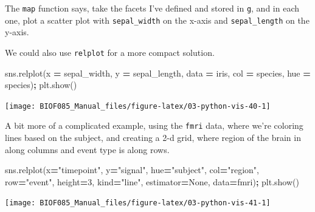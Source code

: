 \documentclass[
  letterpaper,
]{scrbook}
\newenvironment{Shaded}{\begin{snugshade}}{\end{snugshade}}
\newcommand{\DecValTok}[1]{\textcolor[rgb]{0.00,0.00,0.81}{#1}}
\newcommand{\NormalTok}[1]{#1}
\newcommand{\OperatorTok}[1]{\textcolor[rgb]{0.81,0.36,0.00}{\textbf{#1}}}
\newcommand{\StringTok}[1]{\textcolor[rgb]{0.31,0.60,0.02}{#1}}
\newcommand{\VariableTok}[1]{\textcolor[rgb]{0.00,0.00,0.00}{#1}}
\begin{document}
The \texttt{map} function says, take the facets I've defined and stored in \texttt{g}, and in each one, plot a scatter plot with \texttt{sepal\_width} on the x-axis and \texttt{sepal\_length} on the y-axis.

We could also use \texttt{relplot} for a more compact solution.

\begin{Shaded}
\begin{Highlighting}[]
\NormalTok{sns.relplot(x }\OperatorTok{=} \StringTok{\textquotesingle{}sepal\_width\textquotesingle{}}\NormalTok{, y }\OperatorTok{=} \StringTok{\textquotesingle{}sepal\_length\textquotesingle{}}\NormalTok{, data }\OperatorTok{=}\NormalTok{ iris, }
\NormalTok{            col }\OperatorTok{=} \StringTok{\textquotesingle{}species\textquotesingle{}}\NormalTok{, hue }\OperatorTok{=} \StringTok{\textquotesingle{}species\textquotesingle{}}\NormalTok{)}\OperatorTok{;}
\NormalTok{plt.show()}
\end{Highlighting}
\end{Shaded}

\begin{center}\texttt{[image: BIOF085\_Manual\_files/figure-latex/03-python-vis-40-1]} \end{center}

A bit more of a complicated example, using the \texttt{fmri} data, where we're coloring lines based on the subject, and creating a 2-d grid, where region of the brain in along columns and event type is along rows.

\begin{Shaded}
\begin{Highlighting}[]
\NormalTok{sns.relplot(x}\OperatorTok{=}\StringTok{"timepoint"}\NormalTok{, y}\OperatorTok{=}\StringTok{"signal"}\NormalTok{, hue}\OperatorTok{=}\StringTok{"subject"}\NormalTok{,}
\NormalTok{            col}\OperatorTok{=}\StringTok{"region"}\NormalTok{, row}\OperatorTok{=}\StringTok{"event"}\NormalTok{, height}\OperatorTok{=}\DecValTok{3}\NormalTok{,}
\NormalTok{            kind}\OperatorTok{=}\StringTok{"line"}\NormalTok{, estimator}\OperatorTok{=}\VariableTok{None}\NormalTok{, data}\OperatorTok{=}\NormalTok{fmri)}\OperatorTok{;}
\NormalTok{plt.show()}
\end{Highlighting}
\end{Shaded}

\begin{center}\texttt{[image: BIOF085\_Manual\_files/figure-latex/03-python-vis-41-1]} \end{center}
\end{document}

